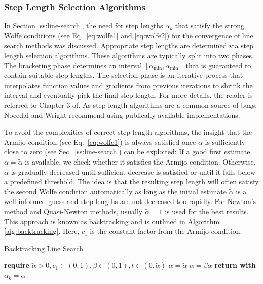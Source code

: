 \subsubsection{Step Length Selection Algorithms}\label{sss:step-length-selection}
In Section \ref{ss:line-search}, the need for step lengths $\alpha_k$ that satisfy the strong Wolfe conditions (see Eq.\ \ref{eq:wolfe1} and \ref{eq:wolfe2})
for the convergence of line search methods was discussed. Appropriate step lengths are determined via step length selection algorithms. 
These algorithms are typically
split into two phases. The bracketing phase determines an interval $[\alpha_{\text{min}}, \alpha_{\text{min}}]$ that is 
guaranteed to contain suitable step lengths. The selection phase is an iterative process that interpolates function values and gradients 
from previous iterations to shrink the interval and eventually pick the final step length. For more details, the reader is 
referred to Chapter 3 of. As step length algorithms are a common source of bugs, Nocedal and Wright recommend using publically 
available implementations.

To avoid the complexities of correct step length algorithms, the insight that the Armijo condition (see Eq.\ \ref{eq:wolfe1}) is always satisfied 
once $\alpha$ is sufficiently close to zero (see Sec.\ \ref{ss:line-search}) can be exploited: If a good first estimate $\alpha = 
\tilde{\alpha}$ is available,
we check whether it satisfies the Armijo condition. Otherwise, $\alpha$ is gradually decreased until sufficient decrease is satisfied or until
it falls below a predefined threshold. The idea is that the resulting step length will often satisfy the second Wolfe condition automatically 
as long as the initial estimate $\tilde{\alpha}$ is a well-informed guess and step lengths are not decreased too rapidly. For Newton's method
and Quasi-Newton methods, usually $\tilde{\alpha} = 1$ is used for the best results. This approach is known
as backtracking and is outlined in Algorithm \ref{alg:backtracking}. Here, $c_1$ is the constant factor from the Armijo condition.

\begin{algorithm}
\caption{Backtracking Line Search}\label{alg:backtracking}
\begin{algorithmic}
\State \textbf{require } $\tilde{\alpha} > 0, c_1 \in (0, 1), \beta \in (0, 1), t \in (0, \tilde{\alpha})$
\State $\alpha = \tilde{\alpha}$
\State $\alpha = \beta \alpha$
\EndWhile
\State \textbf{return with } $\alpha_k = \alpha$
\EndProcedure
\end{algorithmic}
\end{algorithm}

